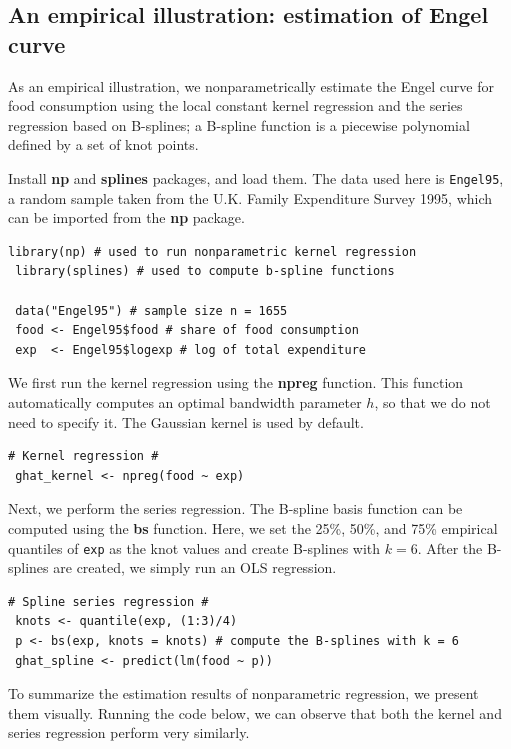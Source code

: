 \documentclass[10.5pt, A4paper, openany, uplatex]{book}
\numberwithin{equation}{section}
\begin{document}
\subsection{An empirical illustration: estimation of Engel curve}

As an empirical illustration, we nonparametrically estimate the Engel curve for food consumption using the local constant kernel regression and the series regression based on B-splines; a B-spline function is a piecewise polynomial defined by a set of knot points.

Install \textbf{np} and \textbf{splines} packages, and load them.
The data used here is \texttt{Engel95}, a random sample taken from the U.K. Family Expenditure Survey 1995, which can be imported from the \textbf{np} package.

\begin{lstlisting}[basicstyle=\ttfamily\footnotesize, frame=single]
 library(np) # used to run nonparametric kernel regression
 library(splines) # used to compute b-spline functions

 data("Engel95") # sample size n = 1655
 food <- Engel95$food # share of food consumption
 exp  <- Engel95$logexp # log of total expenditure 
\end{lstlisting}

We first run the kernel regression using the \textbf{npreg} function.
This function automatically computes an optimal bandwidth parameter $h$, so that we do not need to specify it.
The Gaussian kernel is used by default.

\begin{lstlisting}[basicstyle=\ttfamily\footnotesize, frame=single]
# Kernel regression #
 ghat_kernel <- npreg(food ~ exp)
\end{lstlisting}

Next, we perform the series regression.
The B-spline basis function can be computed using the \textbf{bs} function.
Here, we set the 25\%, 50\%, and 75\% empirical quantiles of \texttt{exp} as the knot values and create B-splines with $k = 6$.
After the B-splines are created, we simply run an OLS regression.

\begin{lstlisting}[basicstyle=\ttfamily\footnotesize, frame=single]
# Spline series regression #
 knots <- quantile(exp, (1:3)/4)
 p <- bs(exp, knots = knots) # compute the B-splines with k = 6
 ghat_spline <- predict(lm(food ~ p))
\end{lstlisting}

To summarize the estimation results of nonparametric regression, we present them visually.
Running the code below, we can observe that both the kernel and series regression perform very similarly.
\end{document}
